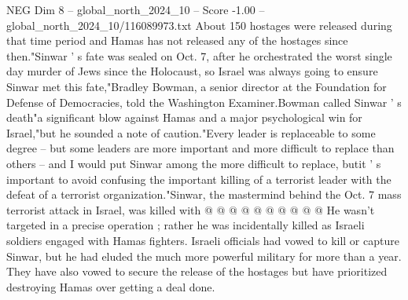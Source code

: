 \begin{textsample}{NEG Dim 8 – global\_north\_2024\_10 – Score -1.00 – global\_north\_2024\_10/116089973.txt}
About 150 hostages were released during that time period and Hamas has not released any of the hostages since then."Sinwar ' s fate was sealed on Oct. 7, after he orchestrated the worst single day murder of Jews since the Holocaust, so Israel was always going to ensure Sinwar met this fate,"Bradley Bowman, a senior director at the Foundation for Defense of Democracies, told the Washington Examiner.Bowman called Sinwar ' s death"a significant blow against Hamas and a major psychological win for Israel,"but he sounded a note of caution."Every leader is replaceable to some degree -- but some leaders are more important and more difficult to replace than others -- and I would put Sinwar among the more difficult to replace, butit ' s important to avoid confusing the important killing of a terrorist leader with the defeat of a terrorist organization."Sinwar, the mastermind behind the Oct. 7 mass terrorist attack in Israel, was killed with @ @ @ @ @ @ @ @ @ @ He wasn't targeted in a precise operation ; rather he was incidentally killed as Israeli soldiers engaged with Hamas fighters.
Israeli officials had vowed to kill or capture Sinwar, but he had eluded the much more powerful military for more than a year.
They have also vowed to secure the release of the hostages but have prioritized destroying Hamas over getting a deal done.

\end{textsample}

